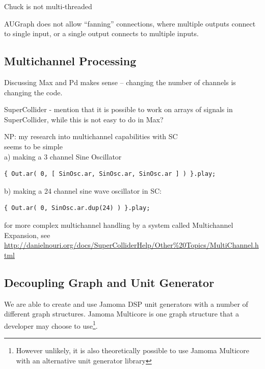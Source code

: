 \documentclass[twoside,a4paper]{article}
\begin{document}

Chuck is not multi-threaded

AUGraph does not allow ``fanning'' connections, where multiple outputs connect to single input, or a single output connects to multiple inputs.



\subsection{Multichannel Processing} %
Discussing Max and Pd makes sense -- changing the number of channels is changing the code.

SuperCollider - mention that it is possible to work on arrays of signals in SuperCollider, while this is not easy to do in Max?


NP: my research into multichannel capabilities with SC\\
seems to be simple\\     
a) making a 3 channel  Sine Oscillator 

\begin{lstlisting}
{ Out.ar( 0, [ SinOsc.ar, SinOsc.ar, SinOsc.ar ] ) }.play;
\end{lstlisting}
b) making a 24 channel sine wave oscillator in SC:
\begin{lstlisting}
{ Out.ar( 0, SinOsc.ar.dup(24) ) }.play;
\end{lstlisting}  

for more complex multichannel handling by a system called Multichannel Expansion, see \url{http://danielnouri.org/docs/SuperColliderHelp/Other%20Topics/MultiChannel.html}





\subsection{Decoupling Graph and Unit Generator} %

We are able to create and use Jamoma DSP unit generators with a number of different graph structures.  Jamoma Multicore is one graph structure that a developer may choose to use\footnote{However unlikely, it is also theoretically possible to use Jamoma Multicore with an alternative unit generator library}.
\end{document}
